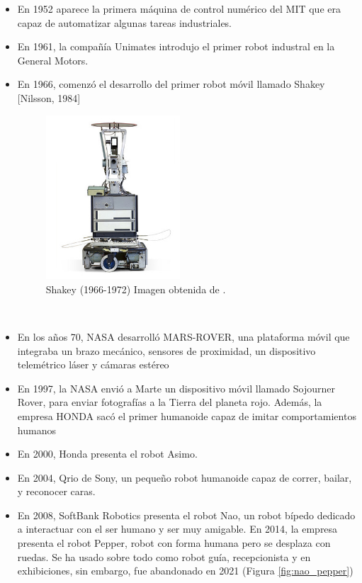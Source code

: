 \begin {itemize}
	\item En 1952 aparece la primera máquina de control numérico del MIT que era capaz de automatizar algunas tareas industriales.
	\item En 1961, la compañía Unimates introdujo el primer robot industral en la General Motors.
	\item En 1966, comenzó el desarrollo del primer robot móvil llamado Shakey [Nilsson, 1984]
	\begin{figure} [H]
	\begin{center}
	\includegraphics[width=5cm]{imagenes/cap1/shakey.jpg}
	\end{center}
	\caption[Shakey (1966-1972)]{Shakey (1966-1972) Imagen obtenida de \cite{shakey-the-robot}.}
	\label{fig:shakey}
	\end{figure}\
	\item En los años 70, NASA desarrolló MARS-ROVER, una plataforma móvil que integraba un brazo mecánico, sensores de proximidad, un dispositivo telemétrico láser y cámaras estéreo
	\item En 1997, la NASA envió a Marte un dispositivo móvil llamado Sojourner Rover, para enviar fotografías a la Tierra del planeta rojo. Además, la empresa HONDA sacó el primer humanoide capaz de imitar comportamientos humanos
	\item En 2000, Honda presenta el robot Asimo.
	\item En 2004, Qrio de Sony, un pequeño robot humanoide capaz de correr, bailar, y reconocer caras.
	\item En 2008, SoftBank Robotics presenta el robot Nao, un robot bípedo dedicado a interactuar con el ser humano y ser muy amigable. En 2014, la empresa presenta el robot Pepper, robot con forma humana pero se desplaza con ruedas. Se ha usado sobre todo como robot guía, recepcionista y en exhibiciones, sin embargo, fue abandonado en 2021 (Figura \ref{fig:nao_pepper})

\end{itemize}
